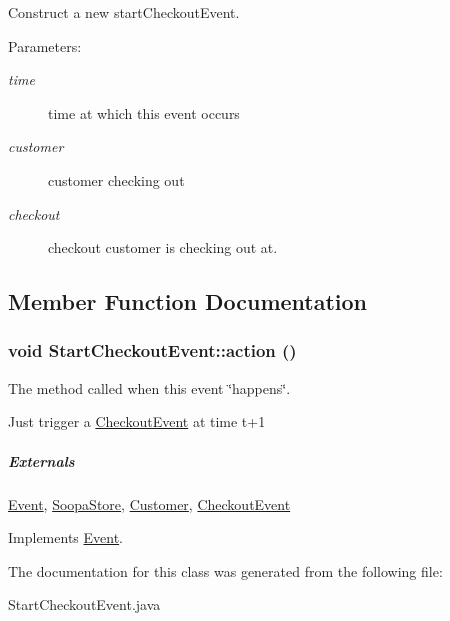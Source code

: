Construct a new startCheckoutEvent. 

\begin{Desc}
\item[Parameters:]
\begin{description}
\item[{\em time}]time at which this event occurs \item[{\em customer}]customer checking out \item[{\em checkout}]checkout customer is checking out at. \end{description}
\end{Desc}


\subsection{Member Function Documentation}
\hypertarget{class_start_checkout_event_84fa31ea480e52721e62eee452d87e0e}{
\subsubsection[{action}]{\setlength{\rightskip}{0pt plus 5cm}void StartCheckoutEvent::action ()}}
\label{class_start_checkout_event_84fa31ea480e52721e62eee452d87e0e}


The method called when this event \char`\"{}happens\char`\"{}. 

Just trigger a \hyperlink{class_checkout_event}{CheckoutEvent} at time t+1 \subparagraph*{Externals}

\hyperlink{class_event}{Event}, \hyperlink{class_soopa_store}{SoopaStore}, \hyperlink{class_customer}{Customer}, \hyperlink{class_checkout_event}{CheckoutEvent} 

Implements \hyperlink{class_event_fea360b9a95713e43cf3f9fa44150074}{Event}.

The documentation for this class was generated from the following file:\begin{CompactItemize}
\item 
StartCheckoutEvent.java\end{CompactItemize}
